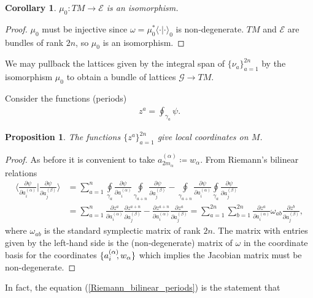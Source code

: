 \documentclass[a4paper,12pt,reqno]{amsart}
\newcounter{counter2}
\numberwithin{equation}{section}
\numberwithin{counter2}{section}
\newcounter{counter3}
\newtheorem{prop}[counter2]{Proposition}
\newtheorem{cor}[counter2]{Corollary}
\begin{document}
\begin{cor}
$\mu_0: TM \to \mathcal{E}$ is an isomorphism.  
\end{cor}
\begin{proof}
$\mu_0$ must be injective since $\omega = \mu_0^*\langle \cdot | \cdot \rangle_0$ is non-degenerate.  $TM$ and $\mathcal{E}$ are bundles of rank $2n$,  so $\mu_0$ is an isomorphism.  
\end{proof}
We may pullback the lattices given by the integral span of $\{\nu_{a}\}_{a=1}^{2n}$ by the isomorphism $\mu_0$ to obtain a bundle of lattices $\mathcal{G} \to TM$.  \par Consider the functions (periods)
\begin{align}
z^{a} = \oint_{\gamma_{a}} \psi.  
\end{align}
\begin{prop}
The functions $\{z^{a}\}_{a=1}^{2n}$ give local coordinates on $M$.  
\end{prop}
\begin{proof}
As before it is convenient to take $a_{2m_\alpha}^{(\alpha)} \coloneqq w_\alpha$.  From Riemann's bilinear relations
\begin{align}
\Bigg\langle \frac{\partial \psi}{\partial a_{i}^{(\alpha)}} \Bigg| \frac{\partial \psi}{\partial a_{j}^{(\beta)}}   \Bigg\rangle &= \sum_{a=1}^{n} \underset{\gamma_{a}}{\oint}\frac{\partial \psi}{\partial a_{i}^{(\alpha)}}  \underset{\gamma_{a+n}}\oint\frac{\partial \psi}{\partial a_{j}^{(\beta)}} - \underset{\gamma_{a+n}}\oint \frac{\partial \psi}{\partial a_{i}^{(\alpha)}}  \underset{\gamma_{a}}\oint \frac{\partial \psi}{\partial a_{j}^{(\beta)}} \nonumber \\&= \sum_{a=1}^{n} \frac{\partial z^{a}}{\partial a_{i}^{(\alpha)}}\frac{\partial z^{a+n}}{\partial a_{j}^{(\beta)}} - \frac{\partial z^{a+n}}{\partial a_{i}^{(\alpha)}}\frac{\partial z^{a}}{\partial a_{j}^{(\beta)}} = \sum_{a=1}^{2n}\sum_{b=1}^{2n} \frac{\partial z^{a}}{\partial a_{i}^{(\alpha)}} \omega_{ab}\frac{\partial z^{b}}{\partial a_{j}^{(\beta)}},   \label{Riemann_bilinear_periods}
\end{align}
where $\omega_{ab}$ is the standard symplectic matrix of rank $2n$.  
The matrix with entries given by the left-hand side is the (non-degenerate) matrix of $\omega$ in the coordinate basis for the coordinates $\{a_{i}^{(\alpha)}\hspace{-1mm},w_\alpha\}$ which implies the Jacobian matrix must be non-degenerate.  
\end{proof}
In fact,  the equation (\ref{Riemann_bilinear_periods}) is the statement that 
\end{document}
